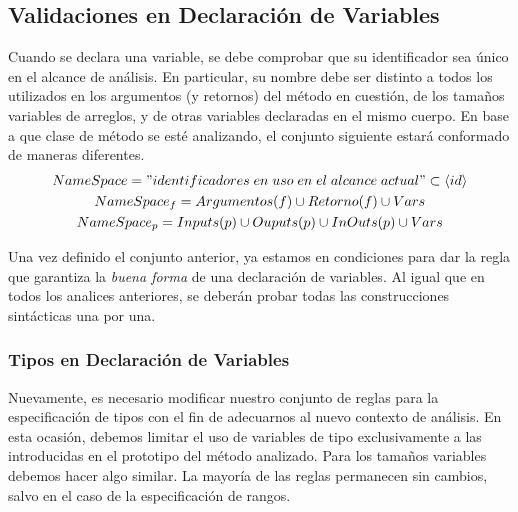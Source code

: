 \documentclass{article}
\begin{document}
\subsection{Validaciones en Declaración de Variables}

Cuando se declara una variable, se debe comprobar que su identificador sea único en el alcance de análisis.
En particular, su nombre debe ser distinto a todos los utilizados en los argumentos (y retornos) del método en cuestión, de los tamaños variables de arreglos, y de otras variables declaradas en el mismo cuerpo.
En base a que clase de método se esté analizando, el conjunto siguiente estará conformado de maneras diferentes.
\begin{gather*}
NameSpace =
"identificadores \; en \; uso \; en \; el \; alcance \; actual" 
\subset \NT{id}
\\
NameSpace_f =
Argumentos(f) \cup Retorno(f) \cup Vars
\\
NameSpace_p =
Inputs(p) \cup Ouputs(p) \cup InOuts(p) \cup Vars
\end{gather*}

Una vez definido el conjunto anterior, ya estamos en condiciones para dar la regla que garantiza la \textit{buena forma} de una declaración de variables.
Al igual que en todos los analices anteriores, se deberán probar todas las construcciones sintácticas una por una.

\begin{prooftree}
\end{prooftree}

\subsubsection {Tipos en Declaración de Variables}

Nuevamente, es necesario modificar nuestro conjunto de reglas para la especificación de tipos con el fin de adecuarnos al nuevo contexto de análisis.
En esta ocasión, debemos limitar el uso de variables de tipo exclusivamente a las introducidas en el prototipo del método analizado.
Para los tamaños variables debemos hacer algo similar.
La mayoría de las reglas permanecen sin cambios, salvo en el caso de la especificación de rangos.
\end{document}
